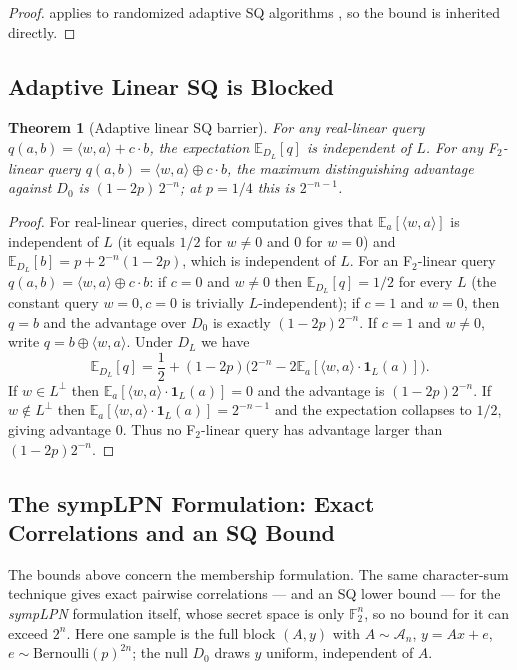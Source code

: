 \documentclass[11pt,a4paper]{article}
\theoremstyle{plain}
\newtheorem{theorem}{Theorem}[section]
\theoremstyle{definition}
\newcommand{\F}{\mathbb{F}}
\newcommand{\E}{\mathbb{E}}
\begin{document}
\begin{proof}
 applies to randomized adaptive SQ algorithms \cite[Theorem 3.7]{FGR+17}, so the bound is inherited directly.
\end{proof}

\subsection{Adaptive Linear SQ is Blocked}
\label{subsec:adaptive-linear}

\begin{theorem}[Adaptive linear SQ barrier]
\label{thm:linear-sq}
For any real-linear query $q(a,b) = \langle w, a \rangle + c \cdot b$, the expectation $\E_{D_L}[q]$ is independent of $L$. For any F$_2$-linear query $q(a,b)=\langle w,a\rangle \oplus c\cdot b$, the maximum distinguishing advantage against $D_0$ is $(1-2p)\,2^{-n}$; at $p=1/4$ this is $2^{-n-1}$.
\end{theorem}

\begin{proof}
For real-linear queries, direct computation gives that $\E_a[\langle w,a\rangle]$ is independent of $L$ (it equals $1/2$ for $w \neq 0$ and $0$ for $w=0$) and $\E_{D_L}[b]=p+2^{-n}(1-2p)$, which is independent of $L$. For an F$_2$-linear query $q(a,b)=\langle w,a\rangle\oplus c\cdot b$: if $c=0$ and $w\neq 0$ then $\E_{D_L}[q]=1/2$ for every $L$ (the constant query $w=0,c=0$ is trivially $L$-independent); if $c=1$ and $w=0$, then $q=b$ and the advantage over $D_0$ is exactly $(1-2p)2^{-n}$. If $c=1$ and $w\neq 0$, write $q=b\oplus\langle w,a\rangle$. Under $D_L$ we have
\[
\E_{D_L}[q] = \frac12 + (1-2p)\bigl(2^{-n}-2\E_a[\langle w,a\rangle\cdot\mathbf 1_L(a)]\bigr).
\]
If $w\in L^\perp$ then $\E_a[\langle w,a\rangle\cdot\mathbf 1_L(a)]=0$ and the advantage is $(1-2p)2^{-n}$. If $w\notin L^\perp$ then $\E_a[\langle w,a\rangle\cdot\mathbf 1_L(a)]=2^{-n-1}$ and the expectation collapses to $1/2$, giving advantage $0$. Thus no F$_2$-linear query has advantage larger than $(1-2p)2^{-n}$.
\end{proof}

\subsection{The sympLPN Formulation: Exact Correlations and an SQ Bound}
\label{subsec:symplpn-sq}

The bounds above concern the membership formulation. The same character-sum technique gives exact pairwise correlations --- and an SQ lower bound --- for the \emph{sympLPN} formulation itself, whose secret space is only $\F_2^n$, so no bound for it can exceed $2^n$. Here one sample is the full block $(A, y)$ with $A \sim \mathcal{A}_n$, $y = Ax + e$, $e \sim \mathrm{Bernoulli}(p)^{2n}$; the null $D_0$ draws $y$ uniform, independent of $A$.
\end{document}
